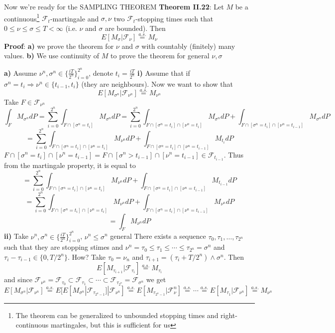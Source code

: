 \documentclass[english]{article}
\newcommand{\note}[1]{\noindent\textbf{#1}}
\newcommand{\F}{\mathcal F}
\newcommand{\as}[1]{\stackrel {a.s.}{#1}}
\begin{document}
Now we're ready for the SAMPLING THEOREM\newline
\note{Theorem II.22}: Let $M$ be a continuous\footnote{The theorem can be generalized to unbounded stopping times and right-continuous martingales, but this is sufficient for us} $\F_t$-martingale and $\sigma,\nu$ two $\F_t$-stopping times such that $0 \leq \nu \leq \sigma \leq T < \infty$ (i.e. $\nu$ and $\sigma$ are bounded). Then
$$E[M_\sigma| \F_\nu] \as= M_\nu$$ 
\note{Proof}: \textbf{a)} we prove the theorem for $\nu$ and $\sigma$ with countably (finitely) many values. \newline
\textbf{b)} We use continuity of $M$ to prove the theorem for general $\nu, \sigma$ \newline

\textbf{a)} Assume $\nu^n, \sigma^n \in \Big\{ \frac{iT}{2^n} \Big\}^{2^n}_{i=0}$, denote $t_i = \frac{iT}{2^n}$ \newline
\textbf{i)} Assume that if $\sigma^n = t_i \Rightarrow \nu^n \in \{t_{i-1}, t_i\}$ (they are neighbours). \newline
Now we want to show that 
$$E[M_{\sigma^n}| \F_{\nu^n}] \as = M_{\nu^n}$$
Take $F\in \F_{\nu^n}$
$$\int_F M_{\sigma^n} dP = \sum^{2^n}_{i=0} \int_{F\cap [\sigma^n = t_i]} M_{\sigma^n} dP = \sum^{2^n}_{i=0} \int_{F\cap [\sigma^n = t_i]\cap[\nu^n=t_i]} M_{\sigma^n} dP + \int_{F\cap [\sigma^n = t_i]\cap[\nu^n=t_{i-1}]} M_{\sigma^n} dP$$
$$= \sum^{2^n}_{i=0} \int_{F\cap [\sigma^n = t_i]\cap[\nu^n=t_i]} M_{\nu^n} dP +\int_{F\cap [\sigma^n = t_i]\cap[\nu^n=t_{i-1}]} M_{t_i} dP$$
 $F\cap [\sigma^n = t_i]\cap[\nu^n=t_{i-1}] = F\cap [\sigma^n > t_{i-1}] \cap [\nu^n = t_{i-1}] \in \F_{t_{i-1}}$. Thus from the martingale property, it is equal to
$$= \sum^{2^n}_{i=0} \int_{F\cap [\sigma^n = t_i]\cap[\nu^n=t_i]} M_{\nu^n} dP +\int_{F\cap [\sigma^n = t_i]\cap[\nu^n=t_{i-1}]} M_{t_{i-1}} dP$$
$$= \sum^{2^n}_{i=0} \int_{F\cap [\sigma^n = t_i]\cap[\nu^n=t_i]} M_{\nu^n} dP +\int_{F\cap [\sigma^n = t_i]\cap[\nu^n=t_{i-1}]} M_{\nu^n} dP$$
$$=\int_F M_{\nu^n} dP$$
\textbf{ii)} Take $\nu^n, \sigma^n \in \{\frac{iT}{2^n}\}^{2^n}_{i=0}$, $\nu^n \leq \sigma^n$ general \newline
There exists a sequence $\tau_0,\tau_1, \dots, \tau_{2^n}$ such that they are stopping stimes and $\nu^n = \tau_0 \leq \tau_1 \leq \cdots \leq \tau_{2^n} = \sigma^n$ and $\tau_i - \tau_{i-1} \in \{ 0, T/2^n\}$. How? Take $\tau_0=\nu_n$ and $\tau_{i+1} = (\tau_i + T/2^n) \wedge \sigma^n$. Then
$$E[M_{\tau_{i+1}} | \F_{\tau_i}] \as= M_{\tau_i}$$
and since $\F_{\nu^n} = \F_{\tau_0} \subset \F_{\tau_1} \subset \cdots \subset \F_{\tau_{2^n}} = \F_{\sigma^n}$ we get
$$E[M_{\sigma^n} | \F_{\nu^n}] \as = E[E[M_{\sigma^n}|\F_{\tau_{2^n-1}}] | \F_{\nu^n}] \as = E[M_{\tau_{2^n-1}}|\F_\nu^n] \as = \cdots \as = E[M_{\tau_1}| \F_{\nu^n}] \as= M_{\nu^n} $$
\end{document}
